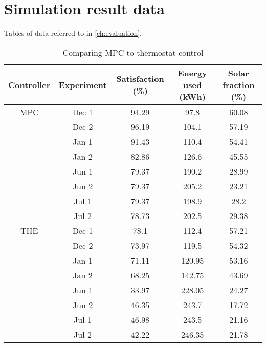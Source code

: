 \chapter{Simulation result data}
\label{app:data}

Tables of data referred to in \autoref{ch:evaluation}.

\begin{table}
   \centering
   \begin{tabular}{c c c c c}
      Controller & Experiment & Satisfaction (\%) & Energy used (kWh) & Solar fraction (\%) \\ \hline
      MPC & Dec 1 & 94.29 & 97.8   & 60.08 \\
          & Dec 2 & 96.19 & 104.1  & 57.19 \\
          & Jan 1 & 91.43 & 110.4  & 54.41 \\
          & Jan 2 & 82.86 & 126.6  & 45.55 \\
          & Jun 1 & 79.37 & 190.2  & 28.99 \\
          & Jun 2 & 79.37 & 205.2  & 23.21 \\
          & Jul 1 & 79.37 & 198.9  & 28.2  \\
          & Jul 2 & 78.73 & 202.5  & 29.38 \\
      THE & Dec 1 & 78.1  & 112.4  & 57.21 \\
          & Dec 2 & 73.97 & 119.5  & 54.32 \\
          & Jan 1 & 71.11 & 120.95 & 53.16 \\
          & Jan 2 & 68.25 & 142.75 & 43.69 \\
          & Jun 1 & 33.97 & 228.05 & 24.27 \\
          & Jun 2 & 46.35 & 243.7  & 17.72 \\
          & Jul 1 & 46.98 & 243.5  & 21.16 \\
          & Jul 2 & 42.22 & 246.35 & 21.78
   \end{tabular}
   \caption{Comparing MPC to thermostat control}
   \label{tab:comparison}
\end{table}

